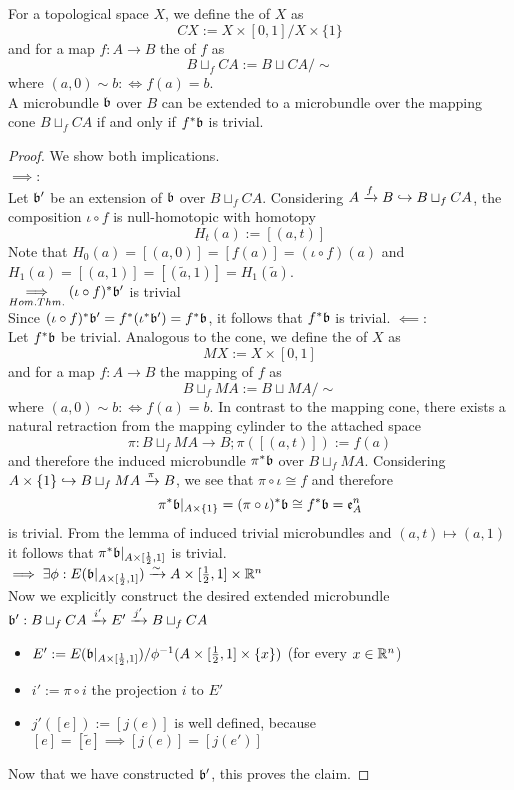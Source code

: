 For a topological space $X$, we define the  of $X$ as 
\[ CX := X \times [0, 1] / X \times \{1\} \]
and for a map $f: A \to B$ the  of $f$ as
\[ B \sqcup_f CA := B \sqcup CA / \sim \]
where $(a, 0) \sim b :\iff f(a) = b$.
 \\
A microbundle $\bb$ over $B$ can be extended to a microbundle over the mapping cone $B \sqcup_f CA$ if and only if $f^*\bb$ is trivial.
\begin{proof}
We show both implications. \\
$\implies$: \\
Let $\bb'$ be an extension of $\bb$ over $B \sqcup_f CA$.
Considering $A \xto{f} B \incl B \sqcup_f CA$, the composition $\iota \circ f$ is null-homotopic with homotopy
\[ H_t(a) := [(a, t)] \]
Note that $H_0(a) = [(a, 0)] = [f(a)] = (\iota \circ f)(a)$ and $H_1(a) = [(a, 1)] = [(\tilde{a}, 1)] = H_1(\tilde{a})$.
\\ $\impliesx{Hom. Thm.} (\iota \circ f)^*\bb'$ is trivial \\
Since $(\iota \circ f)^*\bb' = f^*(\iota^*\bb') = f^*\bb$, it follows that $f^*\bb$ is trivial.
$\impliedby$: \\
Let $f^*\bb$ be trivial.
Analogous to the cone, we define the  of $X$ as
\[ MX := X \times [0, 1] \]
and for a map $f: A \to B$ the mapping  of $f$ as
\[ B \sqcup_f MA := B \sqcup MA / \sim \]
where $(a, 0) \sim b :\iff f(a) = b$.
In contrast to the mapping cone, there exists a natural retraction from the mapping cylinder to the attached space
\[ \pi: B \sqcup_f MA \to B; \pi([(a, t)]) := f(a) \]
and therefore the induced microbundle $\pi^*\bb$ over $B \sqcup_f MA$.
Considering $A \times \{1\} \incl B \sqcup_f MA \xto{\pi} B$, we see that $\pi \circ \iota \cong f$ and therefore
\[ \pi^*\bb\restrict{A \times \{1\}} = (\pi \circ \iota)^*\bb \cong f^*\bb = \mathfrak{e}^n_A\]
is trivial. From the lemma of induced trivial microbundles and $(a, t) \mapsto (a, 1)$ it follows that $\pi^*\bb\restrict{A \times [\frac{1}{2}, 1]}$ is trivial.
\\ $\implies \exists \phi: E(\bb\restrict{A \times [\frac{1}{2}, 1]}) \isomto A \times [\frac{1}{2}, 1] \times \R^n$ \\
Now we explicitly construct the desired extended microbundle $\bundledef{\bb'}{B \sqcup_f CA}{E'}{i'}{j'}$
\begin{itemize}
    \item $E' := E(\bb\restrict{A \times [\frac{1}{2}, 1]}) / \phi^{-1}(A \times [\frac{1}{2}, 1] \times \{x\})$ (for every $x \in \R^n$)
    \item $i' := \pi \circ i$ the projection $i$ to $E'$
    \item $j'([e]) := [j(e)]$ is well defined, because $[e] = [\tilde{e}] \implies [j(e)] = [j(e')]$
\end{itemize}
Now that we have constructed $\bb'$, this proves the claim.
\end{proof}